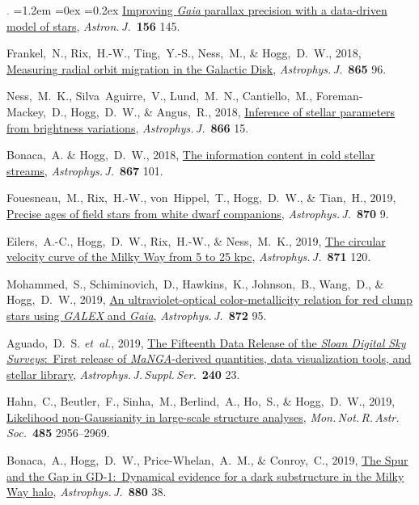 \documentclass[10pt,letterpaper]{article}
\newcommand{\foreign}[1]{\textsl{#1}}
\newcommand{\etal}{\foreign{et~al.}}
\newcommand{\project}[1]{\textsl{#1}}
\newcommand{\doi}[2]{\href{http://dx.doi.org/#1}{{#2}}}
\newcommand{\deemph}[1]{\textcolor{grey}{\footnotesize{#1}}}
\newcommand{\pubnumber}[1]{\deemph{{#1}.}}
\newcounter{refpubnum}
\newcommand{\hogglist}{%
    \rightmargin=0in
    \leftmargin=1.2em
    \topsep=0ex
    \partopsep=0pt
    \itemsep=0.2ex
    \parsep=0pt
    \itemindent=-1.0\leftmargin
    \listparindent=0.0\leftmargin
    \settowidth{\labelsep}{~}
    \usecounter{refpubnum}
  }
\begin{document}
\begin{list}{\pubnumber{\therefpubnum}}{\hogglist}
\doi{10.3847/1538-3881/aad7bf}{Improving \project{Gaia} parallax precision with a data-driven model of stars},
\textit{Astron.\,J.}\ \textbf{156} 145.
\item
Frankel,~N., Rix,~H.-W., Ting,~Y.-S., Ness,~M., \& Hogg,~D.~W., 2018,
\doi{10.3847/1538-4357/aadba5}{Measuring radial orbit migration in the Galactic Disk},
\textit{Astrophys.\,J.}\ \textbf{865} 96.
\item
Ness,~M.~K., Silva~Aguirre,~V., Lund,~M.~N., Cantiello,~M., Foreman-Mackey,~D.,
Hogg,~D.~W., \& Angus,~R., 2018,
\doi{10.3847/1538-4357/aadb40}{Inference of stellar parameters from brightness variations},
\textit{Astrophys.\,J.}\ \textbf{866} 15.
\item
Bonaca,~A. \& Hogg,~D.~W., 2018,
\doi{10.3847/1538-4357/aae4da}{The information content in cold stellar streams},
\textit{Astrophys.\,J.}\ \textbf{867} 101.
\item
Fouesneau,~M., Rix,~H.-W., von~Hippel,~T., Hogg,~D.~W., \& Tian,~H., 2019,
\doi{10.3847/1538-4357/aaee74}{Precise ages of field stars from white dwarf companions},
\textit{Astrophys.\,J.}\ \textbf{870} 9.
\item
Eilers,~A.-C., Hogg,~D.~W., Rix,~H.-W., \& Ness,~M.~K., 2019,
\doi{10.3847/1538-4357/aaf648}{The circular velocity curve of the Milky Way from 5 to 25 kpc},
\textit{Astrophys.\,J.}\ \textbf{871} 120.
\item
Mohammed,~S., Schiminovich,~D., Hawkins,~K., Johnson,~B., Wang,~D., \& Hogg,~D.~W., 2019,
\doi{10.3847/1538-4357/aaf236}{An ultraviolet-optical color-metallicity relation for red clump stars using \project{GALEX} and \project{Gaia}},
\textit{Astrophys.\,J.}\ \textbf{872} 95.
\item
Aguado,~D.~S. \etal, 2019,
\doi{10.3847/1538-4365/aaf651}{The Fifteenth Data Release of the \project{Sloan Digital Sky Surveys}:\ First release of \project{MaNGA}-derived quantities, data visualization tools, and stellar library},
\textit{Astrophys.\,J.\,Suppl.\,Ser.}\ \textbf{240} 23.
\item
Hahn,~C., Beutler,~F., Sinha,~M., Berlind,~A., Ho,~S., \& Hogg,~D.~W., 2019,
\doi{10.1093/mnras/stz558}{Likelihood non-Gaussianity in large-scale structure analyses},
\textit{Mon.\,Not.\,R.\,Astr.\,Soc.}\ \textbf{485} 2956--2969.
\item
Bonaca,~A., Hogg,~D.~W., Price-Whelan,~A.~M., \& Conroy,~C., 2019,
\doi{10.3847/1538-4357/ab2873}{The Spur and the Gap in GD-1:\ Dynamical evidence for a dark substructure in the Milky Way halo},
\textit{Astrophys.\,J.}\ \textbf{880} 38.

\end{list}
\end{document}
